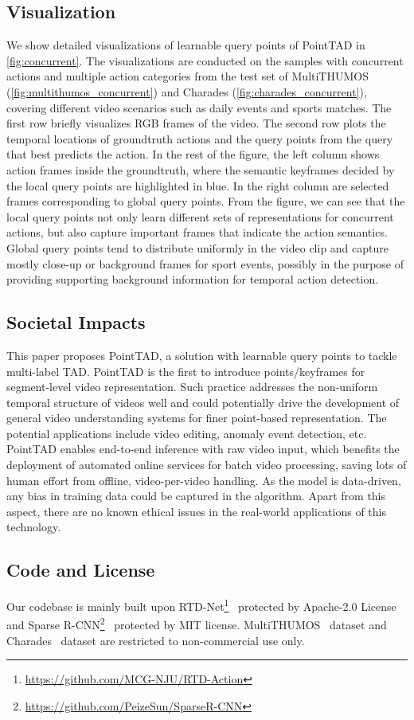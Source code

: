 \documentclass{article}
\begin{document}
\subsection{Visualization}
We show detailed visualizations of learnable query points of PointTAD in \cref{fig:concurrent}. The visualizations are conducted on the samples with concurrent actions and multiple action categories from the test set of MultiTHUMOS (\cref{fig:multithumos_concurrent}) and Charades (\cref{fig:charades_concurrent}), covering different video scenarios such as daily events and sports matches. The first row briefly visualizes RGB frames of the video. The second row plots the temporal locations of groundtruth actions and the query points from the query that best predicts the action. In the rest of the figure, the left column shows action frames inside the groundtruth, where the semantic keyframes decided by the local query points are highlighted in blue. In the right column are selected frames corresponding to global query points. From the figure, we can see that the local query points not only learn different sets of representations for concurrent actions, but also capture important frames that indicate the action semantics. Global query points tend to distribute uniformly in the video clip and capture mostly close-up or background frames for sport events, possibly in the purpose of providing supporting background information for temporal action detection. 

\subsection{Societal Impacts}
\label{sec:societal}
This paper proposes PointTAD, a solution with learnable query points to tackle multi-label TAD. PointTAD is the first to introduce points/keyframes for segment-level video representation. Such practice addresses the non-uniform temporal structure of videos well and could potentially drive the development of general video understanding systems for finer point-based representation. 
The potential applications include video editing, anomaly event detection, etc. PointTAD enables end-to-end inference with raw video input, which benefits the deployment of automated online services for batch video processing, saving lots of human effort from offline, video-per-video handling.
As the model is data-driven, any bias in training data could be captured in the algorithm. Apart from this aspect, there are no known ethical issues in the real-world applications of this technology.

\subsection{Code and License}
\label{sec:license}
Our codebase is mainly built upon RTD-Net\footnote[5]{\url{https://github.com/MCG-NJU/RTD-Action}}~\cite{DBLP:conf/iccv/TanT0W21} protected by Apache-2.0 License and Sparse R-CNN\footnote[6]{\url{https://github.com/PeizeSun/SparseR-CNN}}~\cite{DBLP:conf/cvpr/SunZJKXZTLYW021} protected by MIT license. MultiTHUMOS~\cite{DBLP:journals/ijcv/YeungRJAMF18} dataset and Charades~\cite{DBLP:conf/eccv/SigurdssonVWFLG16} dataset are restricted to non-commercial use only.
\end{document}

